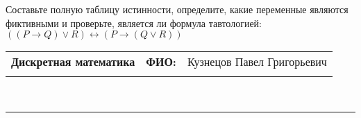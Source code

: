 \documentclass[10pt]{exam}
\newcommand{\class}{Дискретная математика}
\newcommand{\examdate}{}
\begin{document}
\begin{questions}
\begin{enumerate}[a)]
\end{enumerate}\question Составьте полную таблицу истинности, определите, какие переменные являются фиктивными и проверьте, является ли формула тавтологией:
$((P \rightarrow Q) \lor R) \leftrightarrow (P \rightarrow (Q \lor R))$

\end{questions}
\newpage
\begin{flushright}
\begin{tabular}{p{2.8in} r l}
\textbf{\class} & \textbf{ФИО:} &Кузнецов Павел Григорьевич
\\

\textbf{\examdate} &&\\
\end{tabular}\\
\end{flushright}
\rule[1ex]{\textwidth}{.1pt}
\end{document}
